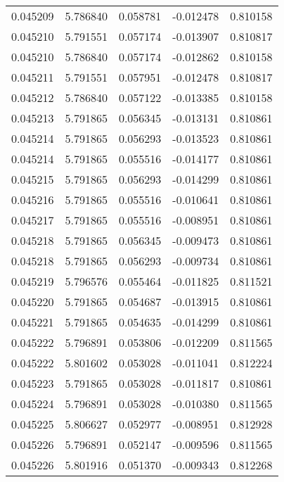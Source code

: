 \begin{tabular}{lrrrr}
0.045209    &  5.786840 &  0.058781 & -0.012478 &             0.810158 \\
0.045210    &  5.791551 &  0.057174 & -0.013907 &             0.810817 \\
0.045210    &  5.786840 &  0.057174 & -0.012862 &             0.810158 \\
0.045211    &  5.791551 &  0.057951 & -0.012478 &             0.810817 \\
0.045212    &  5.786840 &  0.057122 & -0.013385 &             0.810158 \\
0.045213    &  5.791865 &  0.056345 & -0.013131 &             0.810861 \\
0.045214    &  5.791865 &  0.056293 & -0.013523 &             0.810861 \\
0.045214    &  5.791865 &  0.055516 & -0.014177 &             0.810861 \\
0.045215    &  5.791865 &  0.056293 & -0.014299 &             0.810861 \\
0.045216    &  5.791865 &  0.055516 & -0.010641 &             0.810861 \\
0.045217    &  5.791865 &  0.055516 & -0.008951 &             0.810861 \\
0.045218    &  5.791865 &  0.056345 & -0.009473 &             0.810861 \\
0.045218    &  5.791865 &  0.056293 & -0.009734 &             0.810861 \\
0.045219    &  5.796576 &  0.055464 & -0.011825 &             0.811521 \\
0.045220    &  5.791865 &  0.054687 & -0.013915 &             0.810861 \\
0.045221    &  5.791865 &  0.054635 & -0.014299 &             0.810861 \\
0.045222    &  5.796891 &  0.053806 & -0.012209 &             0.811565 \\
0.045222    &  5.801602 &  0.053028 & -0.011041 &             0.812224 \\
0.045223    &  5.791865 &  0.053028 & -0.011817 &             0.810861 \\
0.045224    &  5.796891 &  0.053028 & -0.010380 &             0.811565 \\
0.045225    &  5.806627 &  0.052977 & -0.008951 &             0.812928 \\
0.045226    &  5.796891 &  0.052147 & -0.009596 &             0.811565 \\
0.045226    &  5.801916 &  0.051370 & -0.009343 &             0.812268 \\

\end{tabular}
